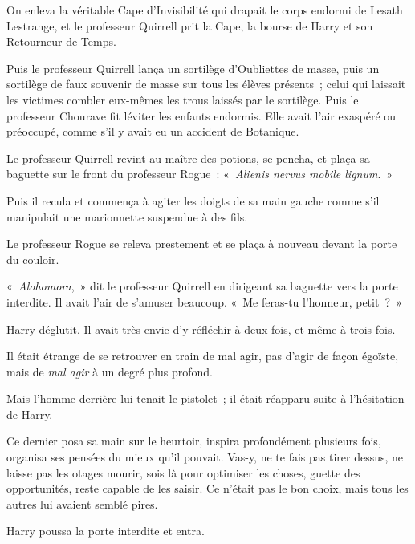 On enleva la véritable Cape d'Invisibilité qui drapait le corps endormi de Lesath Lestrange, et le professeur Quirrell prit la Cape, la bourse de Harry et son Retourneur de Temps.

Puis le professeur Quirrell lança un sortilège d'Oubliettes de masse, puis un sortilège de faux souvenir de masse sur tous les élèves présents~; celui qui laissait les victimes combler eux-mêmes les trous laissés par le sortilège. Puis le professeur Chourave fit léviter les enfants endormis. Elle avait l'air exaspéré ou préoccupé, comme s'il y avait eu un accident de Botanique.

Le professeur Quirrell revint au maître des potions, se pencha, et plaça sa baguette sur le front du professeur Rogue~: «~\emph{Alienis nervus mobile lignum}.~»

Puis il recula et commença à agiter les doigts de sa main gauche comme s'il manipulait une marionnette suspendue à des fils.

Le professeur Rogue se releva prestement et se plaça à nouveau devant la porte du couloir.

«~\emph{Alohomora},~» dit le professeur Quirrell en dirigeant sa baguette vers la porte interdite. Il avait l'air de s'amuser beaucoup. «~Me feras-tu l'honneur, petit~?~»

Harry déglutit. Il avait très envie d'y réfléchir à deux fois, et même à trois fois.

Il était étrange de se retrouver en train de mal agir, pas d'agir de façon égoïste, mais de \emph{mal agir} à un degré plus profond.

Mais l'homme derrière lui tenait le pistolet~; il était réapparu suite à l'hésitation de Harry.

Ce dernier posa sa main sur le heurtoir, inspira profondément plusieurs fois, organisa ses pensées du mieux qu'il pouvait. Vas-y, ne te fais pas tirer dessus, ne laisse pas les otages mourir, sois là pour optimiser les choses, guette des opportunités, reste capable de les saisir. Ce n'était pas le bon choix, mais tous les autres lui avaient semblé pires.

Harry poussa la porte interdite et entra.
